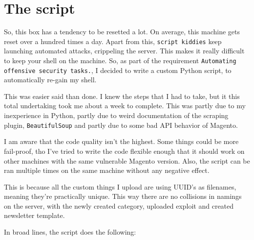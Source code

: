 \chapter{The script}
\label{chap:script}

So, this box has a tendency to be resetted a lot. On average, this machine gets reset over a hundred times a day. Apart from this, \verb|script kiddies| keep launching automated attacks, crippeling the server. This makes it really difficult to keep your shell on the machine. So, as part of the requirement \verb|Automating offensive security tasks.|, I decided to write a custom Python script, to automatically re-gain my shell.

\vspace{5mm}

This was easier said than done. I knew the steps that I had to take, but it this total undertaking took me about a week to complete. This was partly due to my inexperience in Python, partly due to weird documentation of the scraping plugin, \verb|BeautifulSoup| and partly due to some bad API behavior of Magento.

\vspace{5mm}

I am aware that the code quality isn't the highest. Some things could be more fail-proof, tho I've tried to write the code flexible enough that it should work on other machines with the same vulnerable Magento version. Also, the script can be ran multiple times on the same machine without any negative effect.

This is because all the custom things I upload are using UUID's as filenames, meaning they're practically unique. This way there are no collisions in namings on the server, with the newly created category, uploaded exploit and created newsletter template.

\vspace{5mm}

\noindent In broad lines, the script does the following:

